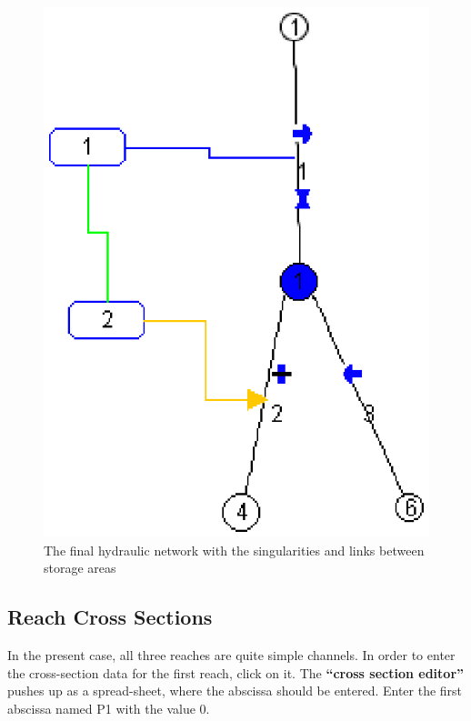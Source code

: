 \documentclass[a4paper,12pt]{article}
\begin{document}
\begin{figure}[h]
  \begin{center}
  \includegraphics[scale=0.6]{Final_network}
  \caption{The final hydraulic network with the singularities and links between storage areas}
  \label{fig:net-types}
  \end{center}
\end{figure}



\subsection{Reach Cross Sections\label{sub:Reach-Cross-Sections} 
}

\hspace{0.5cm}In the present case, all three reaches are quite simple channels.
In order to enter the cross-section data for the first reach, click
on it. The \textbf{{}``cross section editor''} pushes up as a spread-sheet,
where the abscissa should be entered. Enter the first abscissa named
P1 with the value $0$.
\end{document}
